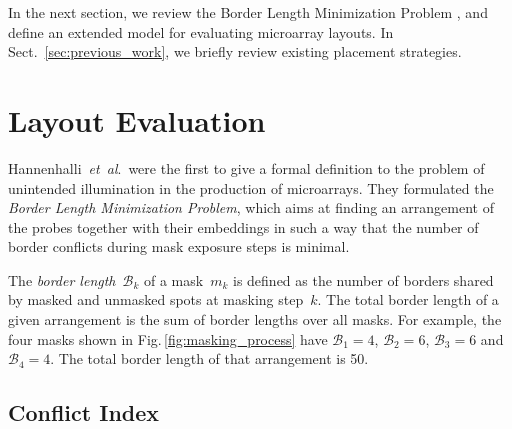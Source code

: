 \documentclass[runningheads]{llncs}
\newcommand{\ignore}[1]{}
\begin{document}
\ignore{
We believe that better solutions can be found if, during the placement, we also
consider the various embeddings that a probe can have. In this paper we present
a new algorithm... %
}

In the next section, we review the Border Length Minimization Problem
\cite{HANNENHALLI02}, and define an extended model for evaluating microarray
layouts. In Sect.~\ref{sec:previous_work}, we briefly review existing
placement strategies. %


\section{Layout Evaluation}
\label{sec:eval}

Hannenhalli~{\it et~al}.\ were the first to give a formal definition to the problem
of unintended illumination in the production of microarrays. They formulated the
\emph{Border Length Minimization Problem}\cite{HANNENHALLI02}, which aims at finding
an arrangement of the probes together with their embeddings in such a way that the number
of border conflicts during mask exposure steps is minimal.

The \emph{border length}~$\mathcal{B}_k$ of a mask~$m_{k}$ is
defined as the number of borders shared by masked and unmasked spots
at masking step~$k$. The total border length of a given arrangement is
the sum of border lengths over all masks. For example, the four masks
shown in Fig.\,\ref{fig:masking_process} have
$\mathcal{B}_1 = 4$, $\mathcal{B}_2 = 6$, $\mathcal{B}_3 = 6$ and $\mathcal{B}_4 = 4$.
The total border length of that arrangement is 50.

\subsection{Conflict Index}
\label{sec:conflict_index}
\end{document}
